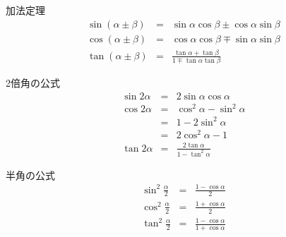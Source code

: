 \documentclass[aspectratio=169, 12pt]{beamer} %
\begin{document}
\begin{frame}{加法定理}
    \begin{eqnarray*}
        \sin{(\alpha\pm\beta)}&=&\sin{\alpha}\cos{\beta}\pm\cos{\alpha}\sin{\beta} \\
        \cos{(\alpha\pm\beta)}&=&\cos{\alpha}\cos{\beta}\mp\sin{\alpha}\sin{\beta} \\
        \tan{(\alpha\pm\beta)}&=&\frac{\tan{\alpha}+\tan{\beta}}{1\mp\tan{\alpha}\tan{\beta}}
    \end{eqnarray*}

\end{frame}
\begin{frame}{2倍角の公式}
    \begin{eqnarray*}
        \sin 2\alpha&=&2\sin \alpha \cos \alpha \\
        \cos 2\alpha&=& \cos^2 \alpha - \sin^2 \alpha \\
        &=&1-2\sin^2 \alpha \\
        &=&2\cos^2\alpha -1 \\
        \tan 2 \alpha &=&\frac{2 \tan\alpha}{1-\tan^2\alpha}
    \end{eqnarray*}
\end{frame}
\begin{frame}{半角の公式}
    \begin{eqnarray*}
        \sin^2\frac{\alpha}{2}&=&\frac{1-\cos\alpha}{2} \\
        \cos^2\frac{\alpha}{2}&=&\frac{1+\cos\alpha}{2} \\
        \tan^2\frac{\alpha}{2}&=&\frac{1-\cos\alpha}{1+\cos\alpha}
    \end{eqnarray*}
\end{frame}
\end{document}
